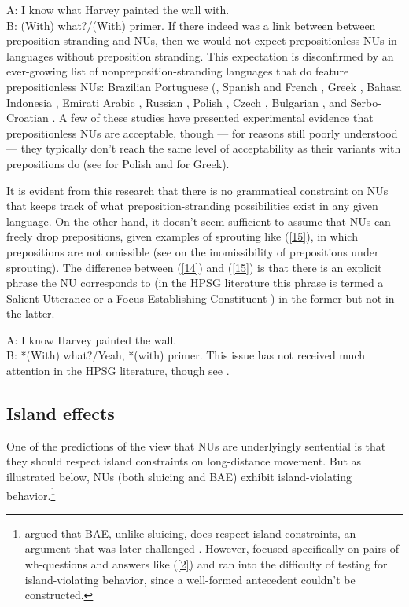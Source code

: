 \documentclass[output=paper
                ,modfonts
                ,nonflat
	        ,collection
	        ,collectionchapter
	        ,collectiontoclongg
 	        ,biblatex
                ,babelshorthands
                ,newtxmath
                ,draftmode
                ,colorlinks, citecolor=brown
]{./langsci/langscibook}
\begin{document}
{\ea A: I know what Harvey painted the wall with.\\B: (With) what?/(With) primer.\label{14}\z
If there indeed was a link between between preposition stranding and NUs, then we would not expect prepositionless NUs in languages without preposition stranding. This expectation is disconfirmed by an ever-growing list of nonpreposition-stranding languages that do feature prepositionless NUs: Brazilian Portuguese (\citep{AlmeidaYoshida 2007}, Spanish and French \citep{Rodrigues2009}, Greek \citep{Molimpakis2018}, Bahasa Indonesia \citep{Fortin2007}, Emirati Arabic \citep{Leung2014}, Russian \citep{Philippova2014}, Polish \citep{Szczegielniak2008, Nykiel2013, Sag2011}, Czech \citep{Caha2011}, Bulgarian \citep{Abels2017}, and Serbo-Croatian \citep{Stjepanovic2008, Stjepanovic2012}. A few of these studies have presented experimental evidence that prepositionless NUs are acceptable, though --- for reasons still poorly understood --- they typically don't reach the same level of acceptability as their variants with prepositions do (see \citealt{Nykiel2013} for Polish and \citealt{Molimpakis2018} for Greek).

It is evident from this research that there is no grammatical constraint on NUs that keeps track of what preposition-stranding possibilities exist in any given language. On the other hand, it doesn't seem sufficient to assume that NUs can freely drop prepositions, given examples of sprouting like (\ref{15}), in which prepositions are not omissible (see \citealt{Chung1995} on the inomissibility of prepositions under sprouting). The difference between (\ref{14}) and (\ref{15}) is that there is an explicit phrase the NU corresponds to (in the HPSG literature this phrase is termed a Salient Utterance \citep{Ginzburg:Sag:2000} or a Focus-Establishing Constituent \citep{Ginzburg2012}) in the former but not in the latter.

\ea A: I know Harvey painted the wall.\\B: *(With) what?/Yeah, *(with) primer.\label{15}\z
This issue has not received much attention in the HPSG literature, though see \citet{Kim2015}.


\subsection{Island effects}
One of the predictions of the view that NUs are underlyingly sentential is that they should respect island constraints on long-distance movement. But as illustrated below, NUs (both sluicing and BAE) exhibit island-violating behavior.\footnote{\citet{Merchant2004} argued that BAE, unlike sluicing, does respect island constraints, an argument that was later challenged \citep[see e.g,][]{CJ2005a, Griffiths2014}. However, \citet{Merchant2004} focused specifically on pairs of wh-questions and answers like (\ref{2}) and ran into the difficulty of testing for island-violating behavior, since a well-formed antecedent couldn't be constructed.}

}
\end{document}
